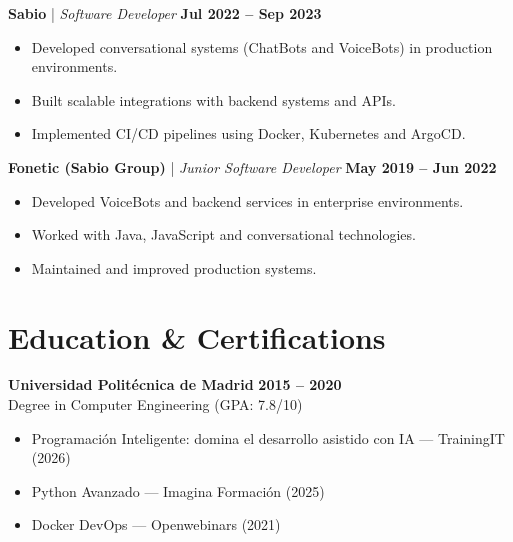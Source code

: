 \documentclass[10pt,a4paper]{article}
\begin{document}
\vspace{6pt}

\textbf{Sabio} | \textit{Software Developer} \hfill \textbf{Jul 2022 -- Sep 2023}
\begin{itemize}
    \item Developed conversational systems (ChatBots and VoiceBots) in production environments.
    \item Built scalable integrations with backend systems and APIs.
    \item Implemented CI/CD pipelines using Docker, Kubernetes and ArgoCD.
\end{itemize}

\vspace{6pt}

\textbf{Fonetic (Sabio Group)} | \textit{Junior Software Developer} \hfill \textbf{May 2019 -- Jun 2022}
\begin{itemize}
    \item Developed VoiceBots and backend services in enterprise environments.
    \item Worked with Java, JavaScript and conversational technologies.
    \item Maintained and improved production systems.
\end{itemize}

\section{Education \& Certifications}

\textbf{Universidad Politécnica de Madrid} \hfill \textbf{2015 -- 2020} \\
Degree in Computer Engineering (GPA: 7.8/10)

\begin{itemize}
    \item Programación Inteligente: domina el desarrollo asistido con IA --- TrainingIT (2026)
    \item Python Avanzado --- Imagina Formación (2025)
    \item Docker DevOps --- Openwebinars (2021)
\end{itemize}
\end{document}
